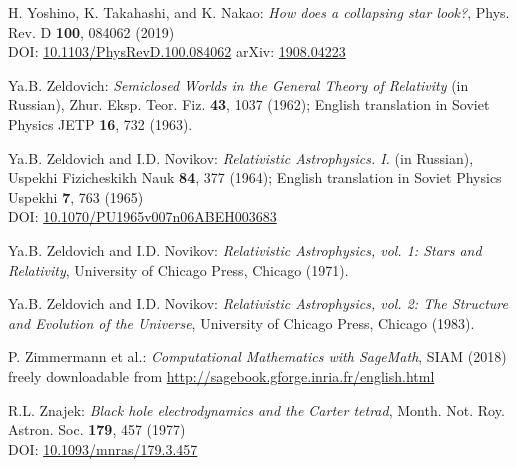 \begin{thebibliography}{123}
H. Yoshino, K. Takahashi, and K. Nakao:
{\em How does a collapsing star look?},
Phys. Rev. D {\bf 100}, 084062 (2019)\\
DOI: \href{https://doi-org.ezproxy.obspm.fr/10.1103/PhysRevD.100.084062}{10.1103/PhysRevD.100.084062}\hfill
arXiv: \href{https://arxiv.org/abs/1908.04223}{1908.04223}


Ya.B. Zeldovich:
{\em Semiclosed Worlds in the General Theory of Relativity} (in Russian),
Zhur. Eksp. Teor. Fiz. {\bf 43}, 1037 (1962); English translation in
Soviet Physics JETP {\bf 16}, 732 (1963).

Ya.B. Zeldovich and I.D. Novikov:
{\em Relativistic Astrophysics. I.} (in Russian),
Uspekhi Fizicheskikh Nauk {\bf 84}, 377 (1964);
English translation in Soviet Physics Uspekhi {\bf 7}, 763 (1965)\\
DOI: \href{https://doi.org/10.1070/PU1965v007n06ABEH003683}{10.1070/PU1965v007n06ABEH003683}

Ya.B. Zeldovich and I.D. Novikov:
{\em Relativistic Astrophysics, vol. 1: Stars and Relativity},
University of Chicago Press, Chicago (1971).

Ya.B. Zeldovich and I.D. Novikov:
{\em Relativistic Astrophysics, vol. 2: The Structure and Evolution of the Universe},
University of Chicago Press, Chicago (1983).

P. Zimmermann et al.: {\em Computational Mathematics with SageMath}, SIAM (2018) \\
freely downloadable from \url{http://sagebook.gforge.inria.fr/english.html}

R.L. Znajek:
{\em Black hole electrodynamics and the Carter tetrad},
Month. Not. Roy. Astron. Soc. {\bf 179}, 457 (1977)\\
DOI: \href{https://doi.org/10.1093/mnras/179.3.457}{10.1093/mnras/179.3.457}

\end{thebibliography}
